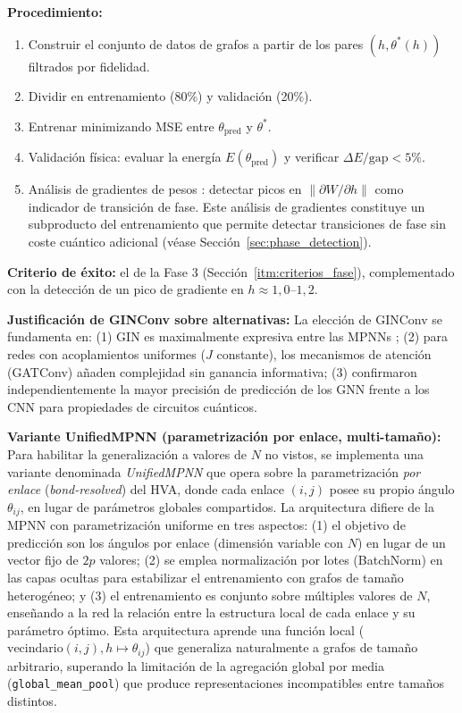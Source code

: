 \documentclass[11pt,a4paper,spanish]{book}
\begin{document}
\textbf{Procedimiento:}
\begin{enumerate}
    \item Construir el conjunto de datos de grafos a partir de los pares $(h, \theta^*(h))$ filtrados por fidelidad.
    \item Dividir en entrenamiento (80\%) y validación (20\%).
    \item Entrenar minimizando MSE entre $\theta_{\text{pred}}$ y $\theta^*$.
    \item Validación física: evaluar la energía $E(\theta_{\text{pred}})$ y verificar $\Delta E/\text{gap} < 5\%$.
    \item Análisis de gradientes de pesos \citep{hernandes2025}: detectar picos en $\|\partial W / \partial h\|$ como indicador de transición de fase. Este análisis de gradientes constituye un subproducto del entrenamiento que permite detectar transiciones de fase sin coste cuántico adicional (véase Sección~\ref{sec:phase_detection}).
\end{enumerate}

\textbf{Criterio de éxito:} el de la Fase 3 (Sección~\ref{itm:criterios_fase}), complementado con la detección de un pico de gradiente en $h \approx 1,0$--$1,2$.

\textbf{Justificación de GINConv sobre alternativas:} La elección de GINConv se fundamenta en: (1) GIN es maximalmente expresiva entre las MPNNs \citep{xu2019}; (2) para redes con acoplamientos uniformes ($J$ constante), los mecanismos de atención (GATConv) añaden complejidad sin ganancia informativa; (3) \citet{meng2025} confirmaron independientemente la mayor precisión de predicción de los GNN frente a los CNN para propiedades de circuitos cuánticos.

\textbf{Variante UnifiedMPNN (parametrización por enlace, multi-tamaño):} Para habilitar la generalización a valores de $N$ no vistos, se implementa una variante denominada \emph{UnifiedMPNN} que opera sobre la parametrización \emph{por enlace} (\emph{bond-resolved}) del HVA, donde cada enlace $(i,j)$ posee su propio ángulo $\theta_{ij}$, en lugar de parámetros globales compartidos. La arquitectura difiere de la MPNN con parametrización uniforme en tres aspectos: (1) el objetivo de predicción son los ángulos por enlace (dimensión variable con $N$) en lugar de un vector fijo de $2p$ valores; (2) se emplea normalización por lotes (BatchNorm) en las capas ocultas para estabilizar el entrenamiento con grafos de tamaño heterogéneo; y (3) el entrenamiento es conjunto sobre múltiples valores de $N$, enseñando a la red la relación entre la estructura local de cada enlace y su parámetro óptimo. Esta arquitectura aprende una función local ($\text{vecindario}(i,j), h \mapsto \theta_{ij}$) que generaliza naturalmente a grafos de tamaño arbitrario, superando la limitación de la agregación global por media (\texttt{global\_mean\_pool}) que produce representaciones incompatibles entre tamaños distintos.
\end{document}

